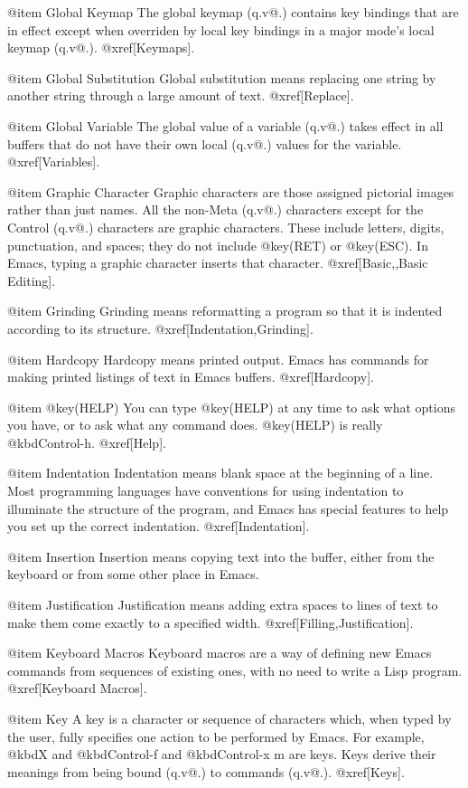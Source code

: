 @item Global Keymap
The global keymap (q.v@.) contains key bindings that are in effect except
when overriden by local key bindings in a major mode's local keymap (q.v@.).
@xref[Keymaps].

@item Global Substitution
Global substitution means replacing one string by another string through a
large amount of text.  @xref[Replace].

@item Global Variable
The global value of a variable (q.v@.) takes effect in all buffers that do
not have their own local (q.v@.) values for the variable.  @xref[Variables].

@item Graphic Character
Graphic characters are those assigned pictorial images rather than just
names.  All the non-Meta (q.v@.) characters except for the Control (q.v@.)
characters are graphic characters.  These include letters, digits,
punctuation, and spaces; they do not include @key(RET) or @key(ESC).  In
Emacs, typing a graphic character inserts that character.
@xref[Basic,,Basic Editing].

@item Grinding
Grinding means reformatting a program so that it is indented
according to its structure.  @xref[Indentation,Grinding].

@item Hardcopy
Hardcopy means printed output.  Emacs has commands for making
printed listings of text in Emacs buffers.  @xref[Hardcopy].

@item @key(HELP)
You can type @key(HELP) at any time to ask what options you have, or to
ask what any command does.  @key(HELP) is really @kbd{Control-h}.
@xref[Help].

@item Indentation
Indentation means blank space at the beginning of a line.  Most
programming languages have conventions for using indentation to
illuminate the structure of the program, and Emacs has special
features to help you set up the correct indentation.
@xref[Indentation].

@item Insertion
Insertion means copying text into the buffer, either from the
keyboard or from some other place in Emacs.

@item Justification
Justification means adding extra spaces to lines of text to make
them come exactly to a specified width.
@xref[Filling,Justification].

@item Keyboard Macros
Keyboard macros are a way of defining new Emacs commands
from sequences of existing ones, with no need to write a Lisp
program.  @xref[Keyboard Macros].

@item Key
A key is a character or sequence of characters which, when typed by
the user, fully specifies one action to be performed by Emacs.  For
example, @kbd{X} and @kbd{Control-f} and @kbd{Control-x m} are keys.
Keys derive their meanings from being bound (q.v@.) to commands (q.v@.).
@xref[Keys].

